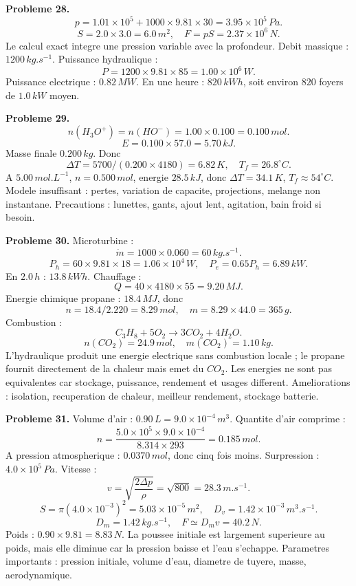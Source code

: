 \documentclass[11pt,a4paper]{article}
\begin{document}
\begin{corrige}
\textbf{Probleme 28.}
\[
p=1.01\times10^5+1000\times9.81\times30=3.95\times10^5\,Pa.
\]
\[
S=2.0\times3.0=6.0\,m^2,
\quad F=pS=2.37\times10^6\,N.
\]
Le calcul exact integre une pression variable avec la profondeur. Debit massique : \(1200\,kg.s^{-1}\). Puissance hydraulique :
\[
P=1200\times9.81\times85=1.00\times10^6\,W.
\]
Puissance electrique : \(0.82\,MW\). En une heure : \(820\,kWh\), soit environ \(820\) foyers de \(1.0\,kW\) moyen.
\end{corrige}

\begin{corrige}
\textbf{Probleme 29.}
\[
n(H_3O^+)=n(HO^-)=1.00\times0.100=0.100\,mol.
\]
\[
E=0.100\times57.0=5.70\,kJ.
\]
Masse finale \(0.200\,kg\). Donc
\[
\Delta T=5700/(0.200\times4180)=6.82\,K,
\quad T_f=26.8^\circ C.
\]
A \(5.00\,mol.L^{-1}\), \(n=0.500\,mol\), energie \(28.5\,kJ\), donc \(\Delta T=34.1\,K\), \(T_f\approx54^\circ C\). Modele insuffisant : pertes, variation de capacite, projections, melange non instantane. Precautions : lunettes, gants, ajout lent, agitation, bain froid si besoin.
\end{corrige}

\begin{corrige}
\textbf{Probleme 30.}
Microturbine :
\[
\dot m=1000\times0.060=60\,kg.s^{-1}.
\]
\[
P_h=60\times9.81\times18=1.06\times10^4\,W,
\quad P_e=0.65P_h=6.89\,kW.
\]
En \(2.0\,h\) : \(13.8\,kWh\). Chauffage :
\[
Q=40\times4180\times55=9.20\,MJ.
\]
Energie chimique propane : \(18.4\,MJ\), donc
\[
n=18.4/2.220=8.29\,mol,
\quad m=8.29\times44.0=365\,g.
\]
Combustion :
\[
C_3H_8+5O_2\rightarrow3CO_2+4H_2O.
\]
\[
n(CO_2)=24.9\,mol,
\quad m(CO_2)=1.10\,kg.
\]
L'hydraulique produit une energie electrique sans combustion locale ; le propane fournit directement de la chaleur mais emet du \(CO_2\). Les energies ne sont pas equivalentes car stockage, puissance, rendement et usages different. Ameliorations : isolation, recuperation de chaleur, meilleur rendement, stockage batterie.
\end{corrige}

\begin{corrige}
\textbf{Probleme 31.}
Volume d'air : \(0.90\,L=9.0\times10^{-4}\,m^3\). Quantite d'air comprime :
\[
n=\frac{5.0\times10^5\times9.0\times10^{-4}}{8.314\times293}=0.185\,mol.
\]
A pression atmospherique : \(0.0370\,mol\), donc cinq fois moins. Surpression : \(4.0\times10^5\,Pa\). Vitesse :
\[
v=\sqrt{\frac{2\Delta p}{\rho}}=\sqrt{800}=28.3\,m.s^{-1}.
\]
\[
S=\pi(4.0\times10^{-3})^2=5.03\times10^{-5}\,m^2,
\quad D_v=1.42\times10^{-3}\,m^3.s^{-1}.
\]
\[
D_m=1.42\,kg.s^{-1},
\quad F\simeq D_mv=40.2\,N.
\]
Poids : \(0.90\times9.81=8.83\,N\). La poussee initiale est largement superieure au poids, mais elle diminue car la pression baisse et l'eau s'echappe. Parametres importants : pression initiale, volume d'eau, diametre de tuyere, masse, aerodynamique.
\end{corrige}
\end{document}
